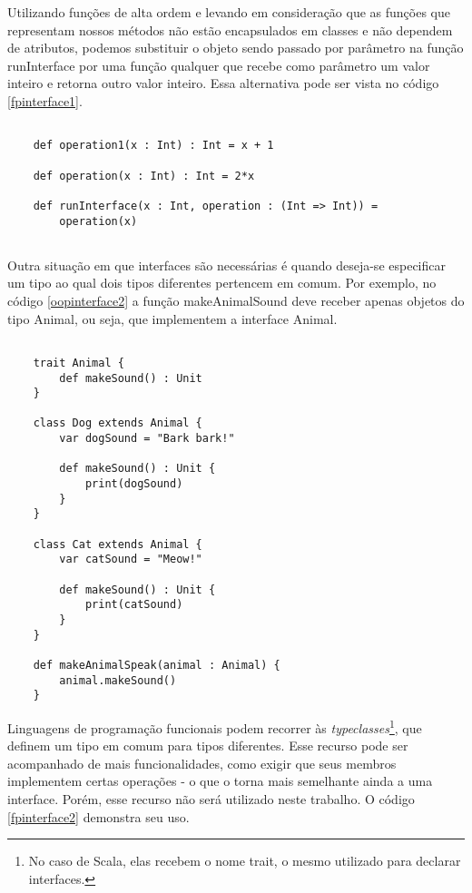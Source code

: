 Utilizando funções de alta ordem e levando em 
consideração que as funções que representam nossos 
métodos não estão encapsulados em classes e 
não dependem de atributos, podemos substituir o 
objeto sendo passado por parâmetro na função 
runInterface por uma função qualquer que recebe 
como parâmetro um valor inteiro e retorna outro 
valor inteiro. Essa alternativa pode ser vista 
no código \ref{fpinterface1}.

\begin{lstlisting}[caption={Interfaces em Programação Funcional},label=fpinterface1]
    
    def operation1(x : Int) : Int = x + 1

    def operation(x : Int) : Int = 2*x

    def runInterface(x : Int, operation : (Int => Int)) =
        operation(x)
    
\end{lstlisting}



Outra situação em que interfaces são necessárias 
é quando deseja-se especificar um tipo ao qual 
dois tipos diferentes pertencem em comum. Por 
exemplo, no código \ref{oopinterface2} a função 
makeAnimalSound deve receber apenas objetos 
do tipo Animal, ou seja, que implementem 
a interface Animal.

\begin{lstlisting}[caption={Interfaces em Orientação a Objetos},label=oopinterface2]
    
    trait Animal {
        def makeSound() : Unit
    }

    class Dog extends Animal {
        var dogSound = "Bark bark!"

        def makeSound() : Unit {
            print(dogSound)
        }
    }

    class Cat extends Animal {
        var catSound = "Meow!"

        def makeSound() : Unit {
            print(catSound)
        }
    }

    def makeAnimalSpeak(animal : Animal) {
        animal.makeSound()
    }

\end{lstlisting}

Linguagens de programação funcionais podem 
recorrer às \textit{typeclasses}\footnote{
    No caso de Scala, elas recebem o nome trait, 
    o mesmo utilizado para declarar interfaces.
}, que definem um tipo em comum para tipos 
diferentes. Esse recurso pode ser acompanhado 
de mais funcionalidades, como exigir que seus 
membros implementem certas operações - o que 
o torna mais semelhante ainda a uma interface. 
Porém, esse recurso não será utilizado neste 
trabalho. O código \ref{fpinterface2} demonstra 
seu uso.


